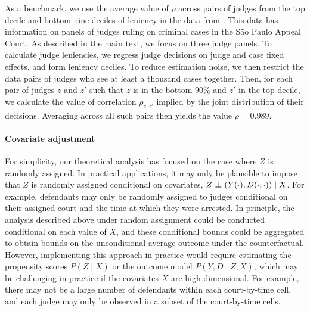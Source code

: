 \documentclass[12pt]{article}%
\theoremstyle{definition}
\newcommand\1{\operatorname{I}\indicatorfence}
\newcommand\indep{\protect\mathpalette{\protect\independenT}{\perp}}
\def\independenT#1#2{\mathrel{\rlap{$#1#2$}\mkern2mu{#1#2}}}
\begin{document}
\begin{appendices}
As a benchmark, we use the average value of $\rho$ across pairs of judges from the top decile and bottom nine deciles of leniency in the data from \textcite{sigstad_monotonicity_2023}. This data has information on panels of judges ruling on criminal cases in the São Paulo Appeal Court. As described in the main text, we focus on three judge panels. To calculate judge leniencies, we regress judge decisions on judge and case fixed effects, and form leniency deciles. To reduce estimation noise, we then restrict the data pairs of judges who see at least a thousand cases together. Then, for each pair of judges $z$ and $z'$ such that $z$ is in the bottom 90\% and $z'$ in the top decile, we calculate the value of correlation $\rho_{z, z'}$ implied by the joint distribution of their decisions. Averaging across all such pairs then yields the value $\rho=0.989$.

\paragraph{Covariate adjustment}
For simplicity, our theoretical analysis has focused on the case where $Z$ is randomly assigned. In practical applications, it may only be plausible to impose that $Z$ is randomly assigned conditional on covariates, $Z \indep (Y(\cdot), D(\cdot,\cdot)) \mid X$. For example, defendants may only be randomly assigned to judges conditional on their assigned court and the time at which they were arrested. In principle, the analysis described above under random assignment could be conducted conditional on each value of $X$, and these conditional bounds could be aggregated to obtain bounds on the unconditional average outcome under the counterfactual. However, implementing this approach in practice would require estimating the propensity scores $P(Z \mid X)$ or the outcome model $P(Y, D \mid Z,X)$, which may be challenging in practice if the covariates $X$ are high-dimensional. For example, there may not be a large number of defendants within each court-by-time cell, and each judge may only be observed in a subset of the court-by-time cells.


\end{appendices}
\end{document}
